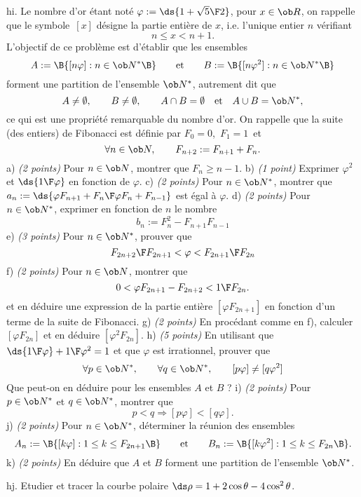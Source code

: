 \exo [Level=1,Fight=3,Learn=3,Field=\Suites,Type=\Problèmes,Origin=,Indication={d) On pourra calculer $b_{n+1}+b_n$. \pn
e) Faire intervenir $a_{2n+1}$ et $a_{2n}$. \pn
j) On pourra considérer le nombre d'éléments de $A_n\cup B_n$.}]  hi.  
Le nombre d'or étant noté $\varphi:=\ds{1+\sqrt5\F2}$, pour $x\in\ob R$, on rappelle que le symbole~$[x]$ désigne la partie entière de $x$, i.e. l'unique entier $n$ vérifiant 
$$
n\le x<n+1.
$$ 
L'objectif de ce problème est d'établir que les ensembles 
$$
A:=\B\{[n\varphi]:n\in\ob N^*\B\}\qquad \hbox{et}\qquad B:=\B\{[n\varphi^2]:n\in\ob N^*\B\}
$$ 
forment une partition de l'ensemble $\ob N^*$, autrement dit que  
$$
A\neq\emptyset, \qquad B\neq\emptyset,  \qquad A\cap B=\emptyset\quad\hbox{et}\quad A\cup B=\ob N^*,
$$
ce qui est une propriété remarquable du nombre d'or. 
\medskip
\noindent
On rappelle que la suite (des entiers) de Fibonacci est définie par $F_0=0$,~$F_1=1$~et  
$$
\forall n\in\ob N, \qquad F_{n+2}:=F_{n+1}+F_n.
$$
a) {\it (2 points)} Pour $n\in\ob N$, montrer que $F_n\ge n-1$. \pn
b) {\it (1 point)} Exprimer $\varphi^2$ et $\ds{1\F\varphi}$ en fonction de $\varphi$. \pn
c) {\it (2 points)} Pour $n\in\ob N^*$, montrer que $a_n:=\ds{\varphi F_{n+1}+F_n\F\varphi F_n+F_{n-1}}$ est égal à $\varphi$. \smallskip\noindent
d) {\it (2 points)} Pour $n\in\ob N^*$, exprimer en fonction de $n$ le nombre  
$$
b_n:=F_n^2-F_{n+1}F_{n-1}
$$ 
e) {\it (3 points)} Pour $n\in\ob N^*$, prouver que 
$$
{F_{2n+2}\F F_{2n+1}}<\varphi<{F_{2n+1}\F F_{2n}}
$$
f) {\it (2 points)} Pour $n\in\ob N$, montrer que 
$$
0<\varphi F_{2n+1}-F_{2n+2}<{1\F F_{2n}}.
$$
et en déduire une expression de la partie entière $[\varphi F_{2n+1}]$ en fonction d'un terme de la suite de Fibonacci. \pn
g) {\it (2 points)} En procédant comme en f), calculer $[\varphi F_{2n}]$ et en déduire $[\varphi^2F_{2n}]$. \pn
h) {\it (5 points)} En utilisant que $\ds {1\F \varphi}+{1\F\varphi^2}=1$ et que $\varphi$ est irrationnel, prouver que 
$$
\forall p\in\ob N^*, \qquad \forall q\in\ob N^*, \qquad [p\varphi]\neq[q\varphi^2]
$$
Que peut-on en déduire pour les ensembles $A$ et $B$ ?\pn
i)  {\it (2 points)} Pour $p\in\ob N^*$ et $q\in\ob N^*$,  montrer que 
$$
p<q\Longrightarrow [p\varphi]<[q\varphi].
$$ 
j)  {\it (2 points)} Pour $n\in\ob N^*$, déterminer la réunion des ensembles 
$$
A_n:=\B\{[k\varphi]:1\le k\le F_{2n+1}\B\}\qquad\hbox{et}\qquad B_n:=\B\{[k\varphi^2]:1\le k\le F_{2n}\B\}. 
$$
k)  {\it (2 points)} En déduire que $A$ et $B$ forment une partition de l'ensemble $\ob N^*$. 

\exo [Level=1,Fight=0,Learn=0,Field=\CourbesParamétréesPolaires,Type=\Exercices,Origin=] hj.  
Etudier et tracer la courbe polaire $\ds\rho=1+2\cos\theta-4\cos^2\theta$. 


